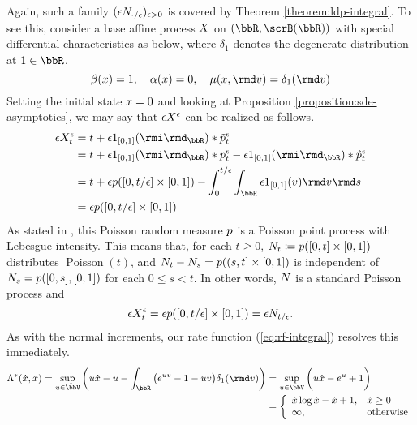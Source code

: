 \begin{example}[Poisson]
  Again, such a family $(\epsilon N_{\cdot/\epsilon})_{\epsilon>0}$ is covered by Theorem \ref{theorem:ldp-integral}.
  To see this, consider a base affine process $X$ on $(\bbR, \scrB(\bbR))$ with special differential characteristics as below, where $\delta_1$ denotes the degenerate distribution at $1 \in \bbR$.
  \begin{equation*}
    \affDrift(\stateVar) = 1, \quad \affDiff(\stateVar) = 0, \quad \affJump(\stateVar, \rmd\markVar) = \delta_1(\rmd\markVar)
  \end{equation*}
  Setting the initial state $x = 0$ and looking at Proposition \ref{proposition:sde-asymptotics}, we may say that $\epsilon X^\epsilon$ can be realized as follows.
  \begin{align*}
    \Xe_t 
    &= t + \epsilon 1_{[0,1]}(\id_\bbR) \ast \compensate{\poisRM^\epsilon}_t \\
    &= t + \epsilon 1_{[0,1]}(\id_\bbR) \ast \poisRM^\epsilon_t - \epsilon 1_{[0,1]}(\id_\bbR) \ast \predproj{\poisRM^\epsilon}_t \\
    &= t + \epsilon \poisRM([0,t/\epsilon] \times [0,1]) - \int_0^{t/\epsilon} \int_\bbR \epsilon 1_{[0,1]}(\markVar) \rmd\markVar \rmd s \\
    &= \epsilon \poisRM([0,t/\epsilon] \times [0,1])
  \end{align*}
  As stated in \cite[Theorem II.4.8]{jacod2003}, this Poisson random measure $p$ is a Poisson point process with Lebesgue intensity.
  This means that, for each $t \geq 0$, $N_t \coloneqq p([0,t] \times [0,1])$ distributes $\operatorname{Poisson}(t)$, and $N_t - N_s = p((s,t] \times [0,1])$ is independent of $N_s = p([0,s], [0,1])$ for each $0 \leq s < t$.
  In other words, $N$ is a standard Poisson process and
  \begin{equation*}
    \epsilon X^\epsilon_t = \epsilon p([0,t/\epsilon] \times [0,1]) = \epsilon N_{t/\epsilon}.
  \end{equation*}
  As with the normal increments, our rate function (\ref{eq:rf-integral}) resolves this immediately.
  \begin{align*}
    \ode^*(\diffVar, \stateVar) 
    = \sup_{\momentVar\in\vecSpace} \bigg( \momentVar\diffVar - \momentVar - \int_\bbR \big( e^{\momentVar\markVar} - 1 - \momentVar\markVar \big) \delta_1(\rmd\markVar) \bigg) 
    &= \sup_{\momentVar\in\vecSpace} \bigg( \momentVar\diffVar - e^\momentVar + 1 \bigg) \\
    &= \left\{\begin{array}{ll}
      \diffVar \log\diffVar - \diffVar + 1, & \diffVar \geq 0 \\
      \infty, & \text{otherwise}
    \end{array}\right.
  \end{align*}
\end{example}

